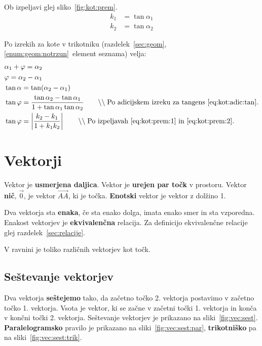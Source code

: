 \documentclass[a4paper,oneside,12pt,fleqn]{article}
\newcommand{\comment}[1]{\ensuremath{\qquad\backslash\backslash\;}\textnormal{#1}}
\def\Vec{\overrightarrow}
\numberwithin{equation}{section}
\begin{document}
Ob izpeljavi glej sliko~\ref{fig:kot:prem}.
\begin{align}
  k_1 &= \tan\alpha_1 \label{eq:kot:prem:1} \\
  k_2 &= \tan\alpha_2 \label{eq:kot:prem:2}
\end{align}

Po izrekih za kote v trikotniku (razdelek~\ref{sec:geom},
\ref{enum:geom:notrzun}~element seznama) velja:
\begin{align*}
  & \alpha_1 + \varphi = \alpha_2 \\
  & \varphi = \alpha_2 - \alpha_1 \\
  & \tan\alpha = \tan(\alpha_2 - \alpha_1) \\
  & \tan\varphi = \frac{\tan\alpha_2 - \tan\alpha_1}{1+\tan\alpha_1\tan\alpha_2} 
  \comment{Po adicijskem izreku za tangens~\eqref{eq:kot:adic:tan}.} \\
  & \tan\varphi = \left| \frac{k_2-k_1}{1+k_1k_2} \right| \comment{Po
  izpeljavah~\eqref{eq:kot:prem:1} in~\eqref{eq:kot:prem:2}.}
\end{align*}

\section{Vektorji}
\label{sec:vec}
Vektor je \textbf{usmerjena daljica}. Vektor je \textbf{urejen par točk} v prostoru.
Vektor \textbf{nič}, $\vec{0}$, je vektor $\Vec{AA}$, ki je točka. 
\textbf{Enotski} vektor je vektor z dolžino 1.

Dva vektorja sta \textbf{enaka}, če sta enako dolga, imata enako smer in sta vzporedna.
Enakost vektorjev je \textbf{ekvivalenčna} relacija. Za definicijo ekvivalenčne relacije glej
razdelek~\ref{sec:relacije}.

V ravnini je toliko različnih vektorjev kot točk.

\subsection{Seštevanje vektorjev}
\label{sec:vec:sest}
Dva vektorja \textbf{seštejemo} tako, da začetno točko 2. vektorja postavimo v začetno točko 1. vektorja. Vsota je vektor, ki
se začne v začetni točki 1. vektorja in konča v končni točki 2. vektorja. Seštevanje
vektorjev je prikazano na sliki~\ref{fig:vec:sest}.
\textbf{Paralelogramsko} pravilo je prikazano na sliki~\ref{fig:vec:sest:par},
\textbf{trikotniško} pa na
sliki~\ref{fig:vec:sest:trik}.
\end{document}
